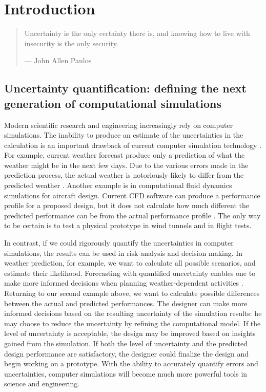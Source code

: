 \chapter{Introduction}

\begin{quote} \begin{it}
Uncertainty is the only certainty there is, and knowing how to live with
insecurity is the only security. \end{it}
\begin{flushright}--- John Allen Paulos\end{flushright}
\end{quote}

\section{Uncertainty quantification:
         defining the next generation of computational simulations}

Modern scientific research and engineering increasingly rely on computer
simulations.  The inability to produce an estimate of the uncertainties in
the calculation is an important drawback of current computer simulation
technology \cite[]{overall}.  For example, current weather forecast
produce only a prediction of what the weather might be in the next
few days.  Due to the various errors made in the prediction process,
the actual weather is notoriously likely to differ from the predicted weather
\cite[]{weather1}.
Another example is in computational fluid dynamics simulations for
aircraft design.  Current CFD software can produce a performance
profile for a proposed design, but it does not calculate how much different
the predicted performance can be from the actual performance profile
\cite[]{design1}.  The only
way to be certain is to test a physical prototype in wind tunnels and in
flight tests.

In contrast, if we could rigorously quantify the uncertainties in computer
simulations, the results can be used in risk analysis and 
decision making.  In weather prediction, for example, we want to calculate all
possible scenarios, and estimate their likelihood.
Forecasting with quantified uncertainty
enables one to make more informed decisions when
planning weather-dependent activities \cite[]{weather3}.
Returning to our second example above, we
want to calculate possible differences between the actual and predicted
performances.
The designer can make more informed decisions based
on the resulting uncertainty of the simulation results:
he may choose to reduce the
uncertainty by refining the computational model.  If the level of uncertainty
is acceptable, the design may be improved based on insights gained from
the simulation.  If both the level of uncertainty and the predicted design
performance are satisfactory, the designer could finalize the design and begin
working on a prototype.  With the ability to accurately quantify errors and
uncertainties, computer simulations will become much
more powerful tools in science and engineering.

